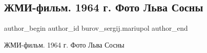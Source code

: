  
 
 
 
 

\subsection{ЖМИ-фильм. 1964 г. Фото Льва Сосны}
\label{sec:11_07_2019.fb.burov_sergij.mariupol.1.zhmi_film_1964_foto_lva_sosny}

\ifcmt
 author_begin
   author_id burov_sergij.mariupol
 author_end
\fi

ЖМИ-фильм. 1964 г. Фото Льва Сосны

